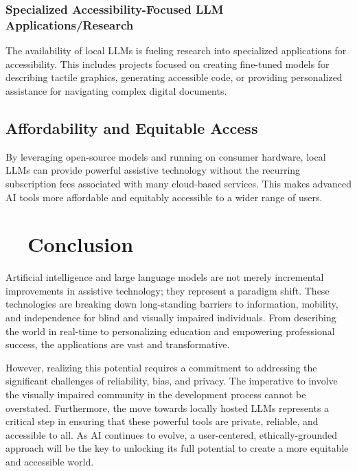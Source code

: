 \subsubsection{Specialized Accessibility-Focused LLM Applications/Research}\label{ch9:sssec:local-llm-research}
The availability of local LLMs is fueling research into specialized applications for accessibility. This includes projects focused on creating fine-tuned models for describing tactile graphics, generating accessible code, or providing personalized assistance for navigating complex digital documents.

\subsection{Affordability and Equitable Access}\label{ch9:ssec:local-llm-affordability}
By leveraging open-source models and running on consumer hardware, local LLMs can provide powerful assistive technology without the recurring subscription fees associated with many cloud-based services. This makes advanced AI tools more affordable and equitably accessible to a wider range of users.

\section{~~Conclusion}\label{ch9:sec:conclusion}
Artificial intelligence and large language models are not merely incremental improvements in assistive technology; they represent a paradigm shift. These technologies are breaking down long-standing barriers to information, mobility, and independence for blind and visually impaired individuals. From describing the world in real-time to personalizing education and empowering professional success, the applications are vast and transformative.

However, realizing this potential requires a commitment to addressing the significant challenges of reliability, bias, and privacy. The imperative to involve the visually impaired community in the development process cannot be overstated. Furthermore, the move towards locally hosted LLMs represents a critical step in ensuring that these powerful tools are private, reliable, and accessible to all. As AI continues to evolve, a user-centered, ethically-grounded approach will be the key to unlocking its full potential to create a more equitable and accessible world.
